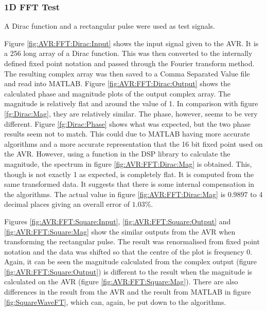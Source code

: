 \subsubsection{1D FFT Test}
A Dirac function and a rectangular pulse were used as test signals. 

Figure \ref{fig:AVR:FFT:Dirac:Input} shows the input signal given to the AVR. It is a 256 long array of a Dirac function. This was then converted to the internally defined fixed point notation and passed through the Fourier transform method. The resulting complex array was then saved to a Comma Separated Value file and read into MATLAB. Figure \ref{fig:AVR:FFT:Dirac:Output} shows the calculated phase and magnitude plots of the output complex array. The magnitude is relatively flat and around the value of 1. In comparison with figure \ref{fg:Dirac:Mag}, they are relatively similar. The phase, however, seems to be very different. Figure \ref{fg:Dirac:Phase} shows what was expected, but the two phase results seem not to match. This could due to MATLAB having more accurate algorithms and a more accurate representation that the 16 bit fixed point used on the AVR. However, using a function in the DSP library to calculate the magnitude, the spectrum in figure \ref{fig:AVR:FFT:Dirac:Mag} is obtained. This, though is not exactly 1 as expected, is completely flat. It is computed from the same transformed data. It suggests that there is some internal compensation in the algorithms. The actual value in figure \ref{fig:AVR:FFT:Dirac:Mag} is $0.9897$ to 4 decimal places giving an overall error of $1.03\%$. 

Figures \ref{fig:AVR:FFT:Square:Input}, \ref{fig:AVR:FFT:Square:Output} and \ref{fig:AVR:FFT:Square:Mag} show the similar outputs from the AVR when transforming the rectangular pulse. The result was renormalised from fixed point notation and the data was shifted so that the centre of the plot is frequency 0.  Again, it can be seen the magnitude calculated from the complex output (figure \ref{fig:AVR:FFT:Square:Output}) is different to the result when the magnitude is calculated on the AVR (figure \ref{fig:AVR:FFT:Square:Mag}). There are also differences in the result from the AVR and the result from MATLAB in figure \ref{fig:SquareWaveFT}, which can, again, be put down to the algorithms. 

